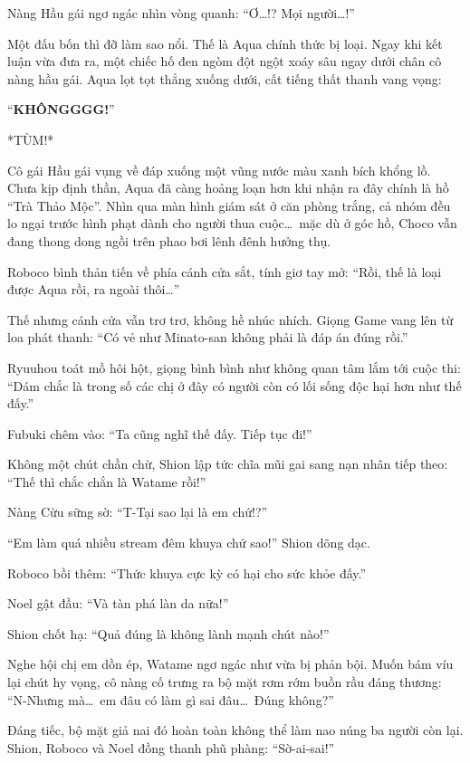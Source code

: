 \documentclass[../main.tex]{subfiles}
\begin{document}
Nàng Hầu gái ngơ ngác nhìn vòng quanh: ``Ơ\dots!? Mọi người\dots!''

Một đấu bốn thì đỡ làm sao nổi. Thế là Aqua chính thức bị loại. Ngay khi kết luận vừa đưa ra, một chiếc hố đen ngòm đột ngột xoáy sâu ngay dưới chân cô nàng hầu gái. Aqua lọt tọt thẳng xuống dưới, cất tiếng thất thanh vang vọng:

``\textbf{KHÔNGGGG!}''

*TÙM!*

Cô gái Hầu gái vụng về đáp xuống một vũng nước màu xanh bích khổng lồ. Chưa kịp định thần, Aqua đã càng hoảng loạn hơn khi nhận ra đây chính là hồ ``Trà Thảo Mộc''. Nhìn qua màn hình giám sát ở căn phòng trắng, cả nhóm đều lo ngại trước hình phạt dành cho người thua cuộc\dots\ mặc dù ở góc hồ, Choco vẫn đang thong dong ngồi trên phao bơi lênh đênh hưởng thụ.


Roboco bình thản tiến về phía cánh cửa sắt, tính giơ tay mở: ``Rồi, thế là loại được Aqua rồi, ra ngoài thôi\dots''

Thế nhưng cánh cửa vẫn trơ trơ, không hề nhúc nhích. Giọng Game vang lên từ loa phát thanh: ``Có vẻ như Minato-san không phải là đáp án đúng rồi.''

Ryuuhou toát mồ hôi hột, giọng bình bình như không quan tâm lắm tới cuộc thi: ``Dám chắc là trong số các chị ở đây có người còn có lối sống độc hại hơn như thế đấy.''

Fubuki chêm vào: ``Ta cũng nghĩ thế đấy. Tiếp tục đi!''

Không một chút chần chừ, Shion lập tức chĩa mũi gai sang nạn nhân tiếp theo: ``Thế thì chắc chắn là Watame rồi!''

Nàng Cừu sững sờ: ``T-Tại sao lại là em chứ!?''

``Em làm quá nhiều stream đêm khuya chứ sao!'' Shion dõng dạc.

Roboco bồi thêm: ``Thức khuya cực kỳ có hại cho sức khỏe đấy.''

Noel gật đầu: ``Và tàn phá làn da nữa!''

Shion chốt hạ: ``Quả đúng là không lành mạnh chút nào!''

Nghe hội chị em dồn ép, Watame ngơ ngác như vừa bị phản bội. Muốn bám víu lại chút hy vọng, cô nàng cố trưng ra bộ mặt rơm rớm buồn rầu đáng thương: ``N-Nhưng mà\dots\ em đâu có làm gì sai đâu\dots\ Đúng không?''

Đáng tiếc, bộ mặt giả nai đó hoàn toàn không thể làm nao núng ba người còn lại. Shion, Roboco và Noel đồng thanh phũ phàng: ``Sờ-ai-sai!''
\end{document}
